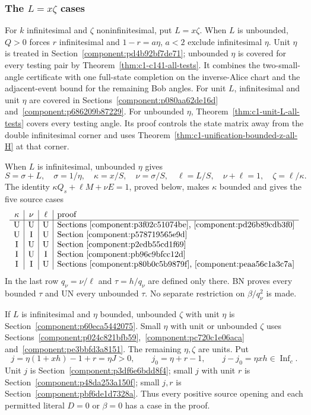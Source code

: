 \subsubsection{The $L=x\zeta$ cases}
\label{sec:c1-L-partition}
For $k$ infinitesimal and $\zeta$ noninfinitesimal, put $L=x\zeta$.
When $L$ is unbounded, $Q>0$ forces $r$ infinitesimal and
$1-r=a\eta$, $a<2$ exclude infinitesimal $\eta$. Unit $\eta$
is treated in Section~\ref{component:pd4b92bf7de71}; unbounded
$\eta$ is covered for every testing pair by
Theorem~\ref{thm:c1-c141-all-tests}. It combines the two-small-angle
certificate with one full-state completion on the inverse-Alice chart
and the adjacent-event bound for the remaining Bob angles.
For unit $L$, infinitesimal and unit $\eta$ are covered in
Sections~\ref{component:p080aa62de16d} and~\ref{component:p686209b87229}.
For unbounded $\eta$, Theorem~\ref{thm:c1-unit-L-all-tests}
covers every testing angle. Its proof controls the state matrix away
from the double infinitesimal corner and uses
Theorem~\ref{thm:c1-unification-bounded-z-all-H} at that corner.

When $L$ is infinitesimal, unbounded $\eta$ gives
\[
 S=\sigma+L,\quad\sigma=1/\eta,\quad
 \kappa=x/S,\quad\nu=\sigma/S,\quad\ell=L/S,
 \quad \nu+\ell=1,\quad \zeta=\ell/\kappa.
\]
The identity $\kappa Q_s+\ell M+\nu E=1$, proved below, makes
$\kappa$ bounded and gives the five source cases
\[
\begin{array}{c|c|c|l}
\kappa&\nu&\ell&\text{proof}\\\hline
\mathrm U&\mathrm U&\mathrm U&\text{Sections~\ref{component:p3f02c51074be}, \ref{component:pd26b89cdb3f0}}\\
\mathrm U&\mathrm I&\mathrm U&\text{Section~\ref{component:p578719565e9d}}\\
\mathrm I&\mathrm U&\mathrm U&\text{Section~\ref{component:p2edb55cd1f69}}\\
\mathrm I&\mathrm U&\mathrm I&\text{Section~\ref{component:pb96c9bfcc12d}}\\
\mathrm I&\mathrm I&\mathrm U&\text{Sections~\ref{component:p80b0c5b9879f}, \ref{component:peaa56c1a3c7a}}
\end{array}
\]
In the last row $q_\nu=\nu/\ell$ and $\tau=h/q_\nu$ are
defined only there. BN proves every bounded $\tau$ and UN every
unbounded $\tau$. No separate restriction on $\beta/q_\nu^2$ is made.

If $L$ is infinitesimal and $\eta$ bounded, unbounded $\zeta$ with
unit $\eta$ is Section~\ref{component:p60eca5442075}. Small $\eta$
with unit or unbounded $\zeta$ uses
Sections~\ref{component:p024c821bfb59},~\ref{component:pc720c1e06aca}
and~\ref{component:pe3bbfd3a8151}.
The remaining $\eta,\zeta$ are units. Put
\[
 j=\eta(1+xh)-1+r=\eta J>0,\qquad j_0=\eta+r-1,
 \qquad j-j_0=\eta xh\in\operatorname{Inf}_c.
\]
Unit $j$ is Section~\ref{component:p3df6e6bdd8f4}; small $j$ with unit
$r$ is Section~\ref{component:p48da253a150f}; small $j,r$ is
Section~\ref{component:pbf6de1d7328a}.
Thus every positive source opening and each permitted literal
$D=0$ or $\beta=0$ has a case in the proof.


